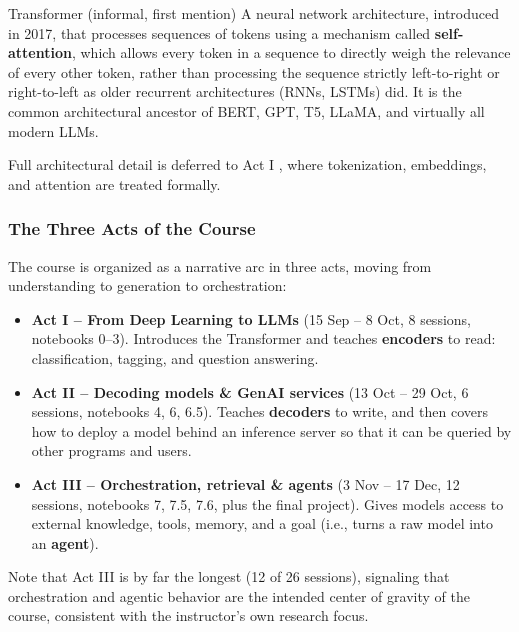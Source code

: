 \begin{defbox}{Transformer (informal, first mention)}
A neural network architecture, introduced in 2017, that processes sequences of tokens using a mechanism called \textbf{self-attention}, which allows every token in a sequence to directly weigh the relevance of every other token, rather than processing the sequence strictly left-to-right or right-to-left as older recurrent architectures (RNNs, LSTMs) did. It is the common architectural ancestor of BERT, GPT, T5, LLaMA, and virtually all modern LLMs. 
\end{defbox}

Full architectural detail is deferred to Act I , where tokenization, embeddings, and attention are treated formally.


\subsubsection{The Three Acts of the Course}

The course is organized as a narrative arc in three acts, moving from understanding to generation to orchestration:

\begin{itemize}
    \item \textbf{Act I -- From Deep Learning to LLMs} (15 Sep -- 8 Oct, 8 sessions, notebooks 0--3). Introduces the Transformer and teaches \textbf{encoders} to read: classification, tagging, and question answering.

    \vspace{0.2cm}
    \item \textbf{Act II -- Decoding models \& GenAI services} (13 Oct -- 29 Oct, 6 sessions, notebooks 4, 6, 6.5). Teaches \textbf{decoders} to write, and then covers how to deploy a model behind an inference server so that it can be queried by other programs and users.

    \vspace{0.2cm}
    \item \textbf{Act III -- Orchestration, retrieval \& agents} (3 Nov -- 17 Dec, 12 sessions, notebooks 7, 7.5, 7.6, plus the final project). Gives models access to external knowledge, tools, memory, and a goal (i.e., turns a raw model into an \textbf{agent}).
\end{itemize}

Note that Act III is by far the longest (12 of 26 sessions), signaling that orchestration and agentic behavior are the intended center of gravity of the course, consistent with the instructor's own research focus.

